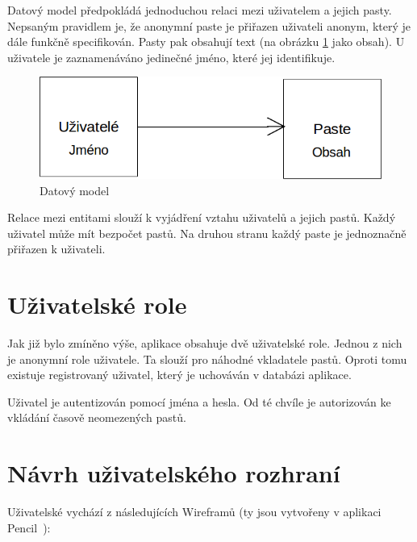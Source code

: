 \documentclass[a4paper,10pt]{report}
\begin{document}
Datový model předpokládá jednoduchou relaci mezi uživatelem a jejich pasty. Nepsaným pravidlem je, že anonymní paste je přiřazen uživateli anonym, který je dále funkčně specifikován. Pasty pak obsahují text (na obrázku \ref{dat_mod} jako obsah). U uživatele je zaznamenáváno jedinečné jméno, které jej identifikuje. 

\begin{figure}[H]
  \centering
	\includegraphics[scale=0.4]{dat_mod.png} 
  \caption{Datový model}
  \label{dat_mod}
\end{figure}

Relace mezi entitami slouží k vyjádření vztahu uživatelů a jejich pastů. Každý uživatel může mít bezpočet pastů. Na druhou stranu každý paste je jednoznačně přiřazen k uživateli.

\section{Uživatelské role}

Jak již bylo zmíněno výše, aplikace obsahuje dvě uživatelské role. Jednou z nich je anonymní role uživatele. Ta slouží pro náhodné vkladatele pastů. Oproti tomu existuje registrovaný uživatel, který je uchováván v databázi aplikace.

Uživatel je autentizován pomocí jména a hesla. Od té chvíle je autorizován ke vkládání časově neomezených pastů. 

\section{Návrh uživatelského rozhraní}

Uživatelské vychází z následujících Wireframů (ty jsou vytvořeny v aplikaci Pencil~\cite{pencil}):
\end{document}
